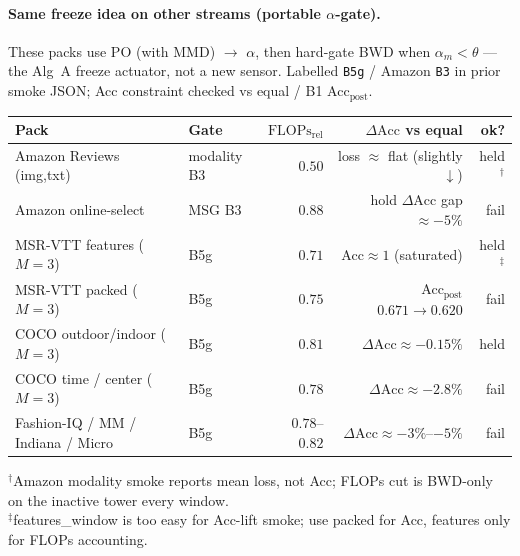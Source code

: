 \documentclass[11pt]{article}
\newcommand{\Acc}{\mathrm{Acc}}
\newcommand{\Flops}{\mathrm{FLOPs}_{\mathrm{rel}}}
\begin{document}
\paragraph{Same freeze idea on other streams (portable $\alpha$-gate).}
These packs use PO (with MMD) $\to$ $\alpha$, then hard-gate
BWD when $\alpha_m<\theta$ --- the Alg~A freeze actuator, not a
new sensor. Labelled \texttt{B5g} / Amazon \texttt{B3} in prior
smoke JSON; Acc constraint checked vs equal / B1 Acc$_{\mathrm{post}}$.
\begin{center}
\small
\begin{tabular}{@{}llrrr@{}}
\toprule
Pack & Gate & $\Flops$ & $\Delta\Acc$ vs equal & ok? \\
\midrule
Amazon Reviews (img,txt)
  & modality B3
  & $0.50$ & loss $\approx$ flat (slightly $\downarrow$) & held$^\dagger$ \\
Amazon online-select
  & MSG B3
  & $0.88$ & hold $\Delta\Acc$ gap $\approx-5\%$ & fail \\
MSR-VTT features ($M{=}3$)
  & B5g
  & $0.71$ & Acc$\approx1$ (saturated) & held$^\ddagger$ \\
MSR-VTT packed ($M{=}3$)
  & B5g
  & $0.75$ & Acc$_{\mathrm{post}}$ $0.671\!\to\!0.620$ & fail \\
COCO outdoor/indoor ($M{=}3$)
  & B5g
  & $0.81$ & $\Delta\Acc\approx-0.15\%$ & held \\
COCO time / center ($M{=}3$)
  & B5g
  & $0.78$ & $\Delta\Acc\approx-2.8\%$ & fail \\
Fashion-IQ / MM / Indiana / Micro
  & B5g
  & $0.78$--$0.82$ & $\Delta\Acc\approx-3\%$--$-5\%$ & fail \\
\bottomrule
\end{tabular}
\end{center}
\smallskip
\noindent\small
$^\dagger$Amazon modality smoke reports mean loss, not Acc;
FLOPs cut is BWD-only on the inactive tower every window.\\
$^\ddagger$features\_window is too easy for Acc-lift smoke;
use packed for Acc, features only for FLOPs accounting.
\end{document}
